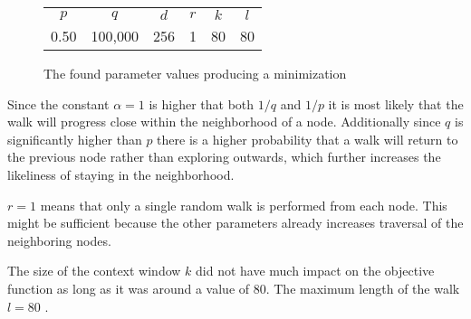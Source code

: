 \begin{figure}%
\centering
\begin{tabular}{cccccc}
\toprule
$p$  & $q$     & $d$ & $r$ & $k$ & $l$ \\
0.50 & 100,000 & 256 & 1   & 80  & 80 \\
\bottomrule
\end{tabular}
\caption[The found parameter values producing a minimization]{The found parameter values producing a minimization }%
\label{tab:paramopt_goodvalues}%
\end{figure}


Since the constant $\alpha = 1$ is higher that both $1/q$ and $1/p$ it is most likely that the walk will progress close within the neighborhood of a node. Additionally since $q$ is significantly higher than $p$ there is a higher probability that a walk will return to the previous node rather than exploring outwards, which further increases the likeliness of staying in the neighborhood.

$r=1$ means that only a single random walk is performed from each node. This might be sufficient because the other parameters already increases traversal of the neighboring nodes.

The size of the context window $k$ did not have much impact on the objective function as long as it was around a value of 80. The maximum length of the walk $l=80$ .

